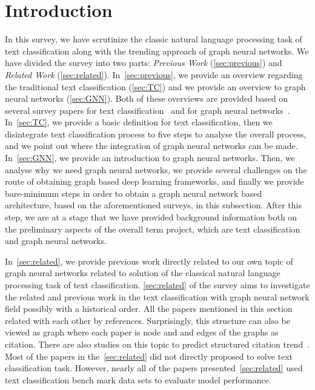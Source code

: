 \section{Introduction}
In this survey, we have scrutinize the classic natural language processing task of text classification along with the trending approach of graph neural networks. We have divided the survey into two parts: \emph{Previous Work} (\cref{sec:previous}) and \emph{Related Work} (\cref{sec:related}). In~\cref{sec:previous}, we provide an overview regarding the traditional text classification (\cref{sec:TC}) and we provide an overview to graph neural networks (\cref{sec:GNN}). Both of these overviews are provided based on several survey papers for text classification~\autocite{kowsari19tc,li20tc,minaee20tc} and for graph neural networks~\autocite{zhou20gnn,wu21gnn,zhang18dlongraphs,sun18adversarial}. In~\cref{sec:TC}, we provide a basic definition for text classification, then we disintegrate text classification process to five steps to analyse the overall process, and we point out where the integration of graph neural networks can be made. In~\cref{sec:GNN}, we provide an introduction to graph neural networks. Then, we analyse why we need graph neural networks, we provide several challenges on the route of obtaining graph based deep learning frameworks, and finally we provide bare-minimum steps in order to obtain a graph neural network based architecture, based on the aforementioned surveys, in this subsection. After this step, we are at a stage that we have provided background information both on the preliminary aspects of the overall term project, which are text classification and graph neural networks. 

In~\cref{sec:related}, we provide previous work directly related to our own topic of graph neural networks related to solution of the classical natural language processing task of text classification. \cref{sec:related} of the survey aims to investigate the related and previous work in the text classification with graph neural network field possibly with a historical order. All the papers mentioned in this section related with each other by references. Surprisingly, this structure can also be viewed as graph where each paper is node and and edges of the graphs as citation. There are also studies on this topic to predict structured citation trend~\autocite{citationGNN}. Most of the papers in the~\cref{sec:related} did not directly proposed to solve text classification task. However, nearly all of the papers presented~\cref{sec:related} used text classification bench mark data sets to evaluate model performance.
